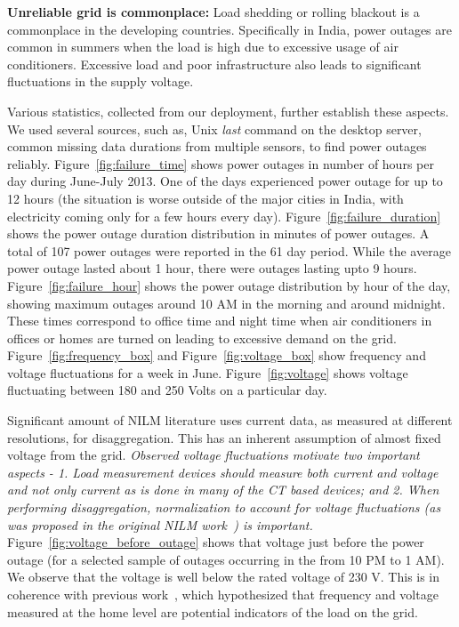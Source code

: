 \documentclass[10pt]{sensys-proc}
\newcommand{\redcolor}[1]{\textcolor{red}{#1}}
\newcommand{\figref}[1]{Figure~\ref{#1}}
\begin{document}
\noindent \textbf{Unreliable grid is commonplace:} Load shedding or rolling blackout is a commonplace in the developing countries. %
Specifically in India, power outages are common in summers when the load is high due to excessive usage of air conditioners. Excessive load and poor infrastructure also leads to significant fluctuations in the supply voltage. %

Various statistics, collected from our deployment, further establish these aspects. We used several sources, such as, Unix \emph{last} command on the desktop server, common missing data durations from multiple sensors, to find power outages reliably. \figref{fig:failure_time} shows power outages in number of hours per day during June-July 2013. One of the days experienced power outage for up to 12 hours (the situation is worse outside of the major cities in India, with electricity coming only for a few hours every day). \figref{fig:failure_duration} shows the power outage duration distribution in minutes of power outages. A total of 107 power outages were reported in the 61 day period. While the average power outage lasted about 1 hour, there were outages lasting upto 9 hours. \figref{fig:failure_hour} shows the power outage distribution by hour of the day, showing maximum outages around 10 AM in the morning and around midnight. These times correspond to office time and night time when air conditioners in offices or homes are turned on leading to excessive demand on the grid. \figref{fig:frequency_box} and \figref{fig:voltage_box} show frequency and voltage fluctuations for a week in June. \figref{fig:voltage} shows voltage fluctuating between 180 and 250 Volts on a particular day.

Significant amount of NILM literature uses current data, as measured at different resolutions, for disaggregation. This has an inherent assumption of almost fixed voltage from the grid. \emph{Observed voltage fluctuations motivate two important aspects - 1. Load measurement devices should measure both current and voltage and not only current as is done in many of the CT based devices; and 2. When performing disaggregation, normalization to account for voltage fluctuations (as was proposed in the original NILM work~\cite{hart}) is important.}
\figref{fig:voltage_before_outage} shows that voltage just before the power outage (for a selected sample of outages occurring in the  from 10 PM to 1 AM). We observe that the voltage is well below the rated voltage of 230 V. This is in coherence with previous work~\cite{nplug}, which hypothesized that frequency and voltage measured at the home level are potential indicators of the load on the grid.
\end{document}
